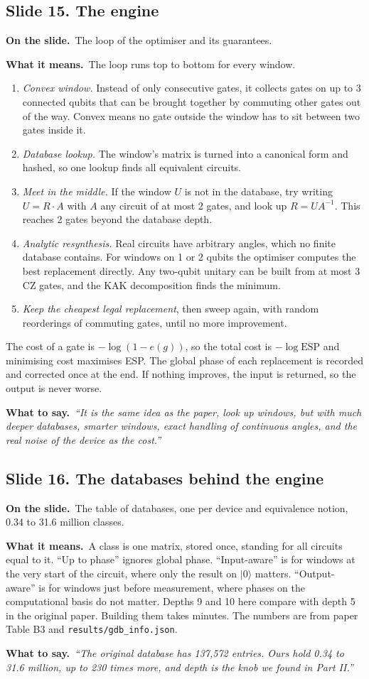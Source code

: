 \documentclass[11pt,a4paper]{article}
\newcommand{\say}[1]{\emph{``#1''}}
\newcommand{\slide}[2]{\subsection*{Slide #1. #2}}
\newcommand{\shows}{\par\textbf{\color{ibar}On the slide.}\ }
\newcommand{\means}{\par\textbf{\color{ibar}What it means.}\ }
\newcommand{\tosay}{\par\textbf{\color{ibar}What to say.}\ }
\begin{document}
\slide{15}{The engine}
\shows The loop of the optimiser and its guarantees.
\means The loop runs top to bottom for every window.
\begin{enumerate}
  \item \emph{Convex window.} Instead of only consecutive gates, it collects gates on up to 3 connected qubits that can be
        brought together by commuting other gates out of the way. Convex means no gate outside the window has to sit
        between two gates inside it.
  \item \emph{Database lookup.} The window's matrix is turned into a canonical form and hashed, so one lookup finds all
        equivalent circuits.
  \item \emph{Meet in the middle.} If the window $U$ is not in the database, try writing $U=R\cdot A$ with $A$ any circuit of
        at most 2 gates, and look up $R=UA^{-1}$. This reaches 2 gates beyond the database depth.
  \item \emph{Analytic resynthesis.} Real circuits have arbitrary angles, which no finite database contains. For windows on
        1 or 2 qubits the optimiser computes the best replacement directly. Any two-qubit unitary can be built from at most 3
        CZ gates, and the KAK decomposition finds the minimum.
  \item \emph{Keep the cheapest legal replacement}, then sweep again, with random reorderings of commuting gates, until no
        more improvement.
\end{enumerate}
The cost of a gate is $-\log(1-e(g))$, so the total cost is $-\log\text{ESP}$ and minimising cost maximises ESP. The
global phase of each replacement is recorded and corrected once at the end. If nothing improves, the input is returned,
so the output is never worse.
\tosay \say{It is the same idea as the paper, look up windows, but with much deeper databases, smarter windows, exact
handling of continuous angles, and the real noise of the device as the cost.}

\slide{16}{The databases behind the engine}
\shows The table of databases, one per device and equivalence notion, 0.34 to 31.6 million classes.
\means A class is one matrix, stored once, standing for all circuits equal to it. ``Up to phase'' ignores global phase.
``Input-aware'' is for windows at the very start of the circuit, where only the result on $|0\rangle$ matters.
``Output-aware'' is for windows just before measurement, where phases on the computational basis do not matter. Depths 9
and 10 here compare with depth 5 in the original paper. Building them takes minutes. The numbers are from paper Table B3 and
\texttt{results/gdb\_info.json}.
\tosay \say{The original database has 137,572 entries. Ours hold 0.34 to 31.6 million, up to 230 times more, and depth is the
knob we found in Part II.}
\end{document}
